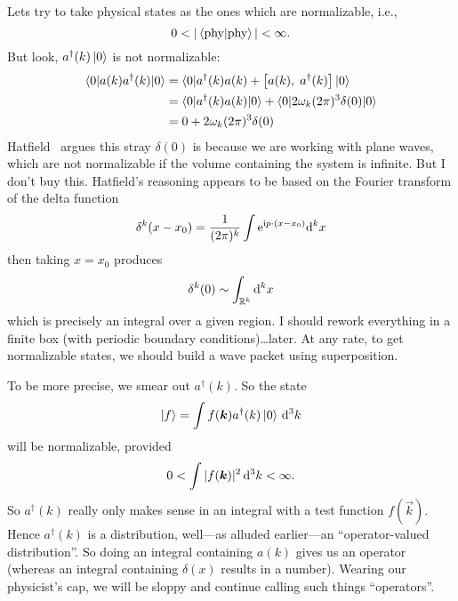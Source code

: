 Lets try to take physical states as the ones which are normalizable,
i.e.,
\begin{equation}
0<|\braket{\mbox{phy}|\mbox{phy}}|<\infty.
\end{equation}
But look, $a^{\dagger}(k)\ket{0}$ is not normalizable:
\begin{subequations}
\begin{align}
\braket{0|a(k)a^{\dagger}(k)|0}
&= \braket{0|a^{\dagger}(k)a(k) + \left\lbrack a(k),\;a^{\dagger}(k)\right\rbrack|0}\\
&= \braket{0|a^{\dagger}(k)a(k)|0}
   + \braket{0|2\omega_{k}(2\pi)^{3}\delta(0)|0}\\
&= 0 + 2\omega_{k}(2\pi)^{3}\delta(0)
\end{align}
\end{subequations}
Hatfield~\cite{Hatfield:1992rz} argues this stray $\delta(0)$ is because
we are working with plane waves, which are not normalizable if the
volume containing the system is infinite. But I don't buy
this. Hatfield's reasoning appears to be based on the Fourier transform
of the delta function
\begin{equation}
\delta^{k}(x-x_{0}) = \frac{1}{(2\pi)^{k}}\int\mathrm{e}^{{\rm i} p\cdot(x-x_{0})}\mathrm{d}^{k}x
\end{equation}
then taking $x=x_{0}$ produces
\begin{equation}
\delta^{k}(0)\sim\int_{\mathbb{R}^{k}}\mathrm{d}^{k}x
\end{equation}
which is precisely an integral over a given region.
I should rework everything in a finite box (with periodic boundary
conditions)\dots later. At any rate, to get normalizable states, we
should build a wave packet using superposition.


To be more precise, we smear out
$a^{\dagger}(k)$. So the state
\begin{equation}
\ket{f} = \int f(\vec{k})a^{\dagger}(k)\ket{0}\,\D^{3}k
\end{equation}
will be normalizable, provided
\begin{equation}
0<\int|f(\vec{k})|^{2}\,\D^{3}k<\infty.
\end{equation}
So $a^{\dagger}(k)$ really only makes sense in an integral with a test
function $f(\vec{k})$. Hence $a^{\dagger}(k)$ is a distribution,
well---as alluded earlier---an ``operator-valued distribution''. So
doing an integral containing $a(k)$ gives us an operator (whereas an
integral containing $\delta(x)$ results in a number). Wearing our
physicist's cap, we will be sloppy and continue calling such things
``operators''.

